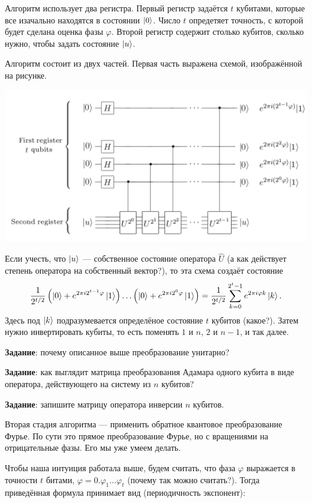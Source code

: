 \documentclass[12pt]{article}
\begin{document}
Алгоритм использует два регистра. Первый регистр задаётся $t$ кубитами, которые все изачально находятся в состоянии $\Ket{0}$. Число $t$ опредетяет точность, с которой будет сделана оценка фазы $\varphi$. Второй регистр содержит столько кубитов, сколько нужно, чтобы задать состояние $\Ket{u}$.

Алгоритм состоит из двух частей. Первая часть выражена схемой, изображённой на рисунке.
\begin{center}
\includegraphics[scale=0.45]{schemephase.png}
\end{center}

Если учесть, что $\Ket{u}$ --- собственное состояние оператора $\hat{U}$ (а как действует степень оператора на собственный вектор?), то эта схема создаёт состояние $$\frac{1}{2^{t / 2}}\left(\Ket{0} + e^{2 \pi i 2^{t - 1}\varphi}\Ket{1}\right)\ldots\left(\Ket{0} + e^{2 \pi i 2^{0}\varphi}\Ket{1}\right) = \frac{1}{2^{t / 2}}\sum\limits_{k = 0}^{2^t - 1} e^{2 \pi i \varphi k}\Ket{k}.$$ Здесь под $\Ket{k}$ подразумевается определёное состояние $t$ кубитов (какое?). Затем нужно инвертировать кубиты, то есть поменять $1$ и $n$, $2$ и $n - 1$, и так далее.

{\bf Задание}: почему описанное выше преобразование унитарно? 

{\bf Задание}: как выглядит матрица преобразования Адамара одного кубита в виде оператора, действующего на систему из $n$ кубитов?

{\bf Задание}: запишите матрицу оператора инверсии $n$ кубитов.

Вторая стадия алгоритма --- применить обратное квантовое преобразование Фурье. По сути это прямое преобразование Фурье, но с вращениями на отрицательные фазы. Его мы уже умеем делать.

Чтобы наша интуиция работала выше, будем считать, что фаза $\varphi$ выражается в точности $t$ битами, $\varphi = 0.\varphi_1\ldots\varphi_t$ (почему так можно считать?). Тогда приведённая формула принимает вид (периодичность экспонент): 
\end{document}
